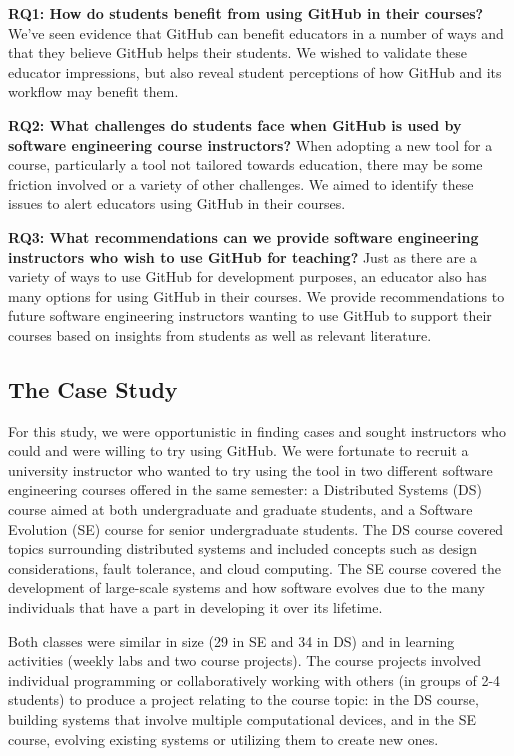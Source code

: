 \textbf{RQ1: How do students benefit from using GitHub in their courses?} We've seen evidence that GitHub can benefit educators in a number of ways \cite{zagalsky2015emergence} and that they believe GitHub helps their students. We wished to validate these educator impressions, but also reveal student perceptions of how GitHub and its workflow may benefit them.

\textbf{RQ2: What challenges do students face when GitHub is used by software engineering course instructors?} When adopting a new tool for a course, particularly a tool not tailored towards education, there may be some friction involved or a variety of other challenges. We aimed to identify these issues to alert educators using GitHub in their courses.

\textbf{RQ3: What recommendations can we provide software engineering instructors who wish to use GitHub for teaching?} Just as there are a variety of ways to use GitHub for development purposes, an educator also has many options for using GitHub in their courses. We provide recommendations to future software engineering instructors wanting to use GitHub to support their courses based on insights from students as well as relevant literature.

\subsection{The Case Study}
For this study, we were opportunistic in finding cases and sought instructors who could and were willing to try using GitHub. We were fortunate to recruit a university instructor who wanted to try using the tool in two different software engineering courses offered in the same semester: a Distributed Systems (DS) course aimed at both undergraduate and graduate students, and a Software Evolution (SE) course for senior undergraduate students. The DS course covered topics surrounding distributed systems and included concepts such as design considerations, fault tolerance, and cloud computing. The SE course covered the development of large-scale systems and how software evolves due to the many individuals that have a part in developing it over its lifetime.

Both classes were similar in size (29 in SE and 34 in DS) and in learning activities (weekly labs and two course projects). The course projects involved individual programming or collaboratively working with others (in groups of 2-4 students) to produce a project relating to the course topic: in the DS course, building systems that involve multiple computational devices, and in the SE course, evolving existing systems or utilizing them to create new ones.

